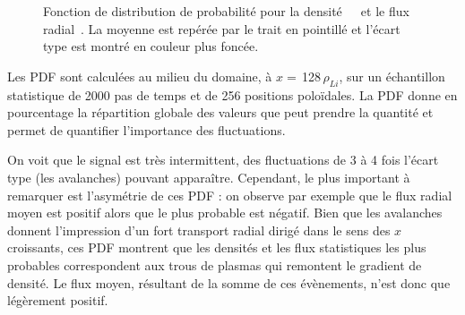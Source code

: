 \begin{refsection}
\begin{figure}[!htbp]
    \centering
    \caption{Fonction de distribution de probabilité pour la
    densité~~~et le flux
    radial~. La moyenne est repérée par le trait en
    pointillé et l'écart type est montré en couleur plus foncée.}
    \label{2-PDFBase}
\end{figure}

Les PDF
sont calculées au milieu du domaine, à $x=\,$128$\,\rho_{Li}$, sur un
échantillon statistique de 2000 pas de temps et de 256 positions
poloïdales. La PDF donne en pourcentage la répartition globale des valeurs
que peut prendre la quantité et permet de quantifier l'importance des fluctuations.

On voit que le signal est très
intermittent, des fluctuations de 3 à 4 fois l'écart type (les avalanches)
pouvant apparaître. Cependant, le plus important à remarquer est l'asymétrie de
ces PDF :
on observe par exemple que le flux radial moyen est positif alors que le plus
probable est négatif. Bien que
les avalanches donnent l'impression d'un fort transport radial dirigé
dans le sens des $x$ croissants, ces PDF montrent que les densités et les flux
statistiques les plus probables correspondent aux trous de plasmas qui
remontent le gradient de densité. Le flux moyen, résultant de la somme de
ces évènements, n'est donc que légèrement positif.


\end{refsection}

